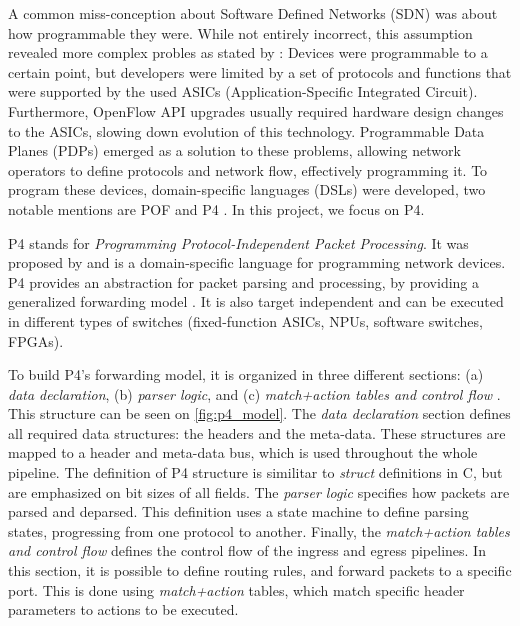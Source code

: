 A common miss-conception about Software Defined Networks (SDN) was about how programmable they were. While not entirely incorrect, this assumption revealed more complex probles as stated by : Devices were programmable to a certain point, but developers were limited by a set of protocols and functions that were supported by the used ASICs (Application-Specific Integrated Circuit). Furthermore, OpenFlow API upgrades usually required hardware design changes to the ASICs, slowing down evolution of this technology. Programmable Data Planes (PDPs) emerged as a solution to these problems, allowing network operators to define protocols and network flow, effectively programming it. To program these devices, domain-specific languages (DSLs) were developed, two notable mentions are POF \cite{Song2013} and P4 \cite{Bosshart2014}. In this project, we focus on P4.


\label{sec:bg:p4}

P4 stands for \textit{Programming Protocol-Independent Packet Processing}. It was proposed by  and is a domain-specific language for programming network devices. P4 provides an abstraction for packet parsing and processing, by providing a generalized forwarding model \cite{Cordeiro2017}. It is also target independent and can be executed in different types of switches (fixed-function ASICs, NPUs, software switches, FPGAs).

To build P4's forwarding model, it is organized in three different sections: (a) \textit{data declaration}, (b) \textit{parser logic}, and (c) \textit{match+action tables and control flow} \cite{Cordeiro2017}. This structure can be seen on \autoref{fig:p4_model}. The \textit{data declaration} section defines all required data structures: the headers and the meta-data. These structures are mapped to a header and meta-data bus, which is used throughout the whole pipeline. The definition of P4 structure is similitar to \textit{struct} definitions in C, but are emphasized on bit sizes of all fields. The \textit{parser logic} specifies how packets are parsed and deparsed. This definition uses a state machine to define parsing states, progressing from one protocol to another. Finally, the \textit{match+action tables and control flow} defines the control flow of the ingress and egress pipelines. In this section, it is possible to define routing rules, and forward packets to a specific port. This is done using \textit{match+action} tables, which match specific header parameters to actions to be executed.

